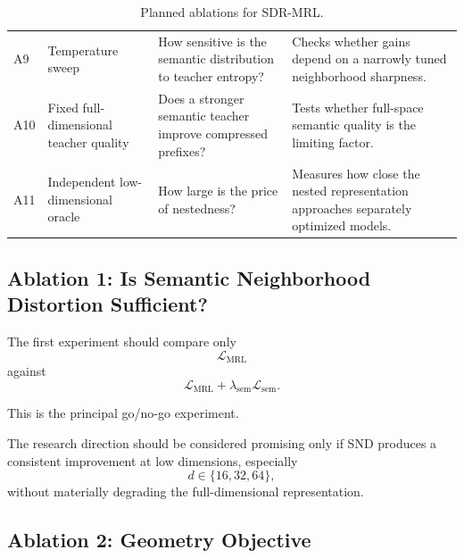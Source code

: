 \documentclass[11pt]{article}
\newcommand{\cL}{\mathcal{L}}
\begin{document}
\begin{table}[t]
\begin{tabularx}{\textwidth}{
    >{\raggedright\arraybackslash}p{}
    >{\raggedright\arraybackslash}p{}
    >{\raggedright\arraybackslash}X
    >{\raggedright\arraybackslash}X
}
A9 &
Temperature sweep &
How sensitive is the semantic distribution to teacher entropy? &
Checks whether gains depend on a narrowly tuned neighborhood sharpness.
\\

A10 &
Fixed full-dimensional teacher quality &
Does a stronger semantic teacher improve compressed prefixes? &
Tests whether full-space semantic quality is the limiting factor.
\\

A11 &
Independent low-dimensional oracle &
How large is the price of nestedness? &
Measures how close the nested representation approaches separately optimized models.
\\

\bottomrule
\end{tabularx}
\caption{
Planned ablations for SDR-MRL.
}
\label{tab:ablations}
\end{table}


\subsection{Ablation 1: Is Semantic Neighborhood Distortion Sufficient?}

The first experiment should compare only
\begin{equation}
    \cL_{\mathrm{MRL}}
\end{equation}
against
\begin{equation}
    \cL_{\mathrm{MRL}}
    +
    \lambda_{\mathrm{sem}}\cL_{\mathrm{sem}}.
\end{equation}

This is the principal go/no-go experiment.

The research direction should be considered promising only if SND produces a consistent improvement at low dimensions, especially
\begin{equation}
    d\in\{16,32,64\},
\end{equation}
without materially degrading the full-dimensional representation.


\subsection{Ablation 2: Geometry Objective}
\end{document}
